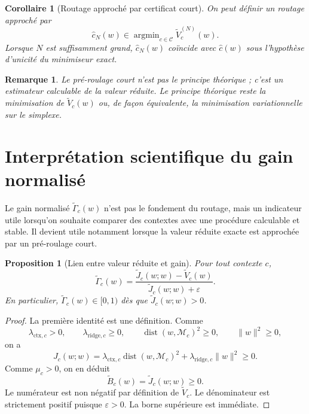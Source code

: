 \documentclass[11pt,a4paper]{article}
\newtheorem{proposition}{Proposition}[section]
\newtheorem{corollary}{Corollaire}[section]
\newtheorem{remark}{Remarque}[section]
\DeclareMathOperator{\argmin}{argmin}
\DeclareMathOperator{\dist}{dist}
\newcommand{\Mcal}{\mathcal M}
\newcommand{\Ccal}{\mathcal C}
\begin{document}
\begin{corollary}[Routage approché par certificat court]
On peut définir un routage approché par
\[
\hat c_N(w)\in\argmin_{c\in\Ccal}\widetilde V_c^{(N)}(w).
\]
Lorsque \(N\) est suffisamment grand, \(\hat c_N(w)\) coïncide avec \(\hat c(w)\) sous l'hypothèse d'unicité du minimiseur exact.
\end{corollary}

\begin{remark}
Le pré-roulage court n'est pas le principe théorique ; c'est un estimateur calculable de la valeur réduite. Le principe théorique reste la minimisation de \(\widetilde V_c(w)\) ou, de façon équivalente, la minimisation variationnelle sur le simplexe.
\end{remark}

\section{Interprétation scientifique du gain normalisé}

Le gain normalisé \(\widetilde \Gamma_c(w)\) n'est pas le fondement du routage, mais un indicateur utile lorsqu'on souhaite comparer des contextes avec une procédure calculable et stable. Il devient utile notamment lorsque la valeur réduite exacte est approchée par un pré-roulage court.

\begin{proposition}[Lien entre valeur réduite et gain]
Pour tout contexte \(c\),
\[
\widetilde \Gamma_c(w)
=
\frac{\widetilde J_c(w;w)-\widetilde V_c(w)}{\widetilde J_c(w;w)+\varepsilon}.
\]
En particulier, \(\widetilde \Gamma_c(w)\in[0,1)\) dès que \(\widetilde J_c(w;w)>0\).
\end{proposition}

\begin{proof}
La première identité est une définition. Comme
\[
\lambda_{\mathrm{ctx},c}>0,\qquad \lambda_{\mathrm{ridge},c}\ge 0,\qquad \dist(w,\Mcal_c)^2\ge 0,\qquad \|w\|^2\ge 0,
\]
on a
\[
J_c(w;w)
=
\lambda_{\mathrm{ctx},c}\dist(w,\Mcal_c)^2+\lambda_{\mathrm{ridge},c}\|w\|^2\ge 0.
\]
Comme \(\mu_c>0\), on en déduit
\[
\widetilde B_c(w)=\widetilde J_c(w;w)\ge 0.
\]
Le numérateur est non négatif par définition de \(\widetilde V_c\). Le dénominateur est strictement positif puisque \(\varepsilon>0\). La borne supérieure est immédiate.
\end{proof}
\end{document}
